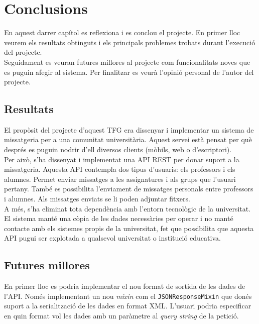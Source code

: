 
\chapter{Conclusions}\label{conclusions}

En aquest darrer capítol es reflexiona i es conclou el projecte. En primer lloc veurem els resultats obtinguts i els principals problemes trobats durant l'execució del projecte.\\

Seguidament es veuran futures millores al projecte com funcionalitats noves que es puguin afegir al sistema. Per finalitzar es veurà l'opinió personal de l'autor del projecte.\\

\section{Resultats}

El propòsit del projecte d'aquest \ac{TFG} era dissenyar i implementar un sistema de missatgeria per a una comunitat universitària. Aquest servei està pensat per què després es puguin nodrir d'ell diversos clients (mòbils, web o d'escriptori).\\

Per això, s'ha dissenyat i implementat una \ac{API} \ac{REST} per donar suport a la missatgeria. Aquesta \ac{API} contempla dos tipus d'usuaris: els professors i els alumnes. Permet enviar missatges a les assignatures i als grups que l'usuari pertany. També es possibilita l'enviament de missatges personals entre professors i alumnes. Als missatges enviats se li poden adjuntar fitxers.\\

A més, s'ha eliminat tota dependència amb l'entorn tecnològic de la universitat. El sistema manté una còpia de les dades necessàries per operar i no manté contacte amb els sistemes propis de la universitat, fet que possibilita que aquesta \ac{API} pugui ser explotada a qualsevol universitat o institució educativa.\\

\section{Futures millores}

En primer lloc es podria implementar el nou format de sortida de les dades de l'\ac{API}. Només implementant un nou \emph{mixin} com el \texttt{JSONResponseMixin} que donés suport a la serialització de les dades en format \ac{XML}. L'usuari podria especificar en quin format vol les dades amb un paràmetre al \emph{query string} de la petició. \\


